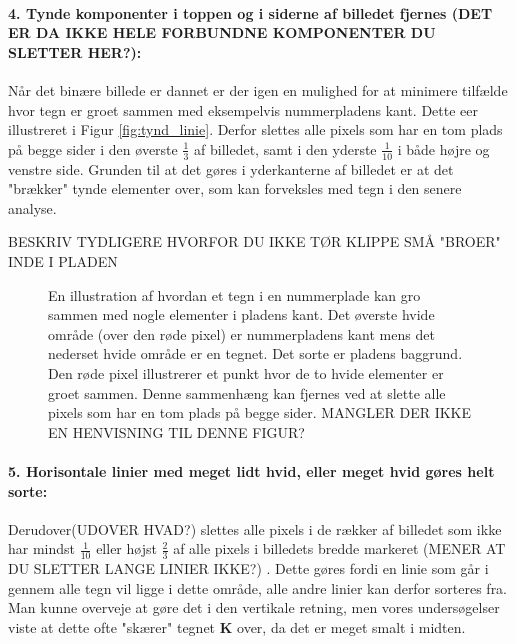 \paragraph{4. Tynde komponenter i toppen og i siderne af billedet fjernes (DET ER DA IKKE HELE FORBUNDNE KOMPONENTER DU SLETTER HER?):}
Når det binære billede er dannet er der igen en mulighed for at minimere tilfælde hvor tegn er groet sammen med eksempelvis nummerpladens kant. Dette eer illustreret i Figur \vref{fig:tynd_linie}. Derfor slettes alle pixels som har en tom plads på begge sider i den øverste $\frac{1}{3}$ af billedet, samt i den yderste $\frac{1}{10}$ i både højre og venstre side. Grunden til at det gøres i yderkanterne af billedet er at det "brækker" tynde elementer over, som kan forveksles med tegn i den senere analyse.

BESKRIV TYDLIGERE HVORFOR DU IKKE TØR KLIPPE SMÅ "BROER" INDE I PLADEN


\begin{figure}[htp]
\centering
{} 
\caption{En illustration af hvordan et tegn i en nummerplade kan gro sammen med nogle elementer i pladens kant. Det øverste hvide område (over den røde pixel) er nummerpladens kant mens det nederset hvide område er en tegnet. Det sorte er pladens baggrund. Den røde pixel illustrerer et punkt hvor de to hvide elementer er groet sammen. Denne sammenhæng kan fjernes ved at slette alle pixels som har en tom plads på begge sider. MANGLER DER IKKE EN HENVISNING TIL DENNE FIGUR?}
\label{fig:tynd_linie}
\end{figure}

\paragraph{5. Horisontale linier med meget lidt hvid, eller meget hvid gøres helt sorte:}
Derudover(UDOVER HVAD?) slettes alle pixels i de rækker af billedet som ikke har mindst $\frac{1}{10}$ eller højst $\frac{2}{3}$ af alle pixels i billedets bredde markeret (MENER AT DU SLETTER LANGE LINIER IKKE?) . Dette gøres fordi en linie som går i gennem alle tegn vil ligge i dette område, alle andre linier kan derfor sorteres fra. Man kunne overveje at gøre det i den vertikale retning, men vores undersøgelser viste at dette ofte "skærer" tegnet \textbf{K} over, da det er meget smalt i midten.

